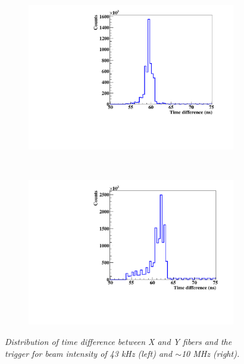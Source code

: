 \documentclass[a4paper,11pt]{article}
\begin{document}
\begin{figure}[H]
\centering
    \begin{subfigure}{0.49\textwidth} \centering \includegraphics[width=\textwidth]{figures/time_coinc_43kHz_August.pdf} \caption{} \label{fig:Time_43kHz}
    \end{subfigure}
    ~
    \begin{subfigure}{0.49\textwidth} \centering \includegraphics[width=\textwidth]{figures/time_coinc_10MHz_August.pdf} \caption{} \label{fig:Time_10MHz}
    \end{subfigure}
\caption{\small{\textit{Distribution of time difference between X and Y fibers and the trigger for beam intensity of 43 kHz (left) and $\sim$10 MHz (right).}}}
\label{fig:Time_coinc}
\end{figure}
\end{document}
